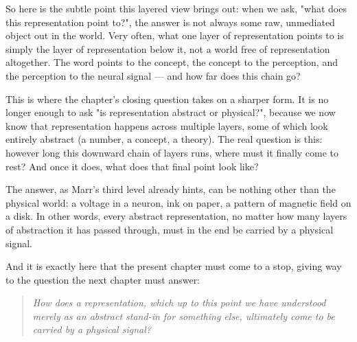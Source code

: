 So here is the subtle point this layered view brings out: when we ask, "what does this representation point to?", the answer is not always some raw, unmediated object out in the world. Very often, what one layer of representation points to is simply the layer of representation below it, not a world free of representation altogether. The word points to the concept, the concept to the perception, and the perception to the neural signal --- and how far does this chain go?

This is where the chapter's closing question takes on a sharper form. It is no longer enough to ask "is representation abstract or physical?", because we now know that representation happens across multiple layers, some of which look entirely abstract (a number, a concept, a theory). The real question is this: however long this downward chain of layers runs, where must it finally come to rest? And once it does, what does that final point look like?

The answer, as Marr's third level already hints, can be nothing other than the physical world: a voltage in a neuron, ink on paper, a pattern of magnetic field on a disk. In other words, every abstract representation, no matter how many layers of abstraction it has passed through, must in the end be carried by a physical signal.

And it is exactly here that the present chapter must come to a stop, giving way to the question the next chapter must answer:

\begin{quote}
\itshape
How does a representation, which up to this point we have understood merely as an abstract stand-in for something else, ultimately come to be carried by a physical signal?
\end{quote}
